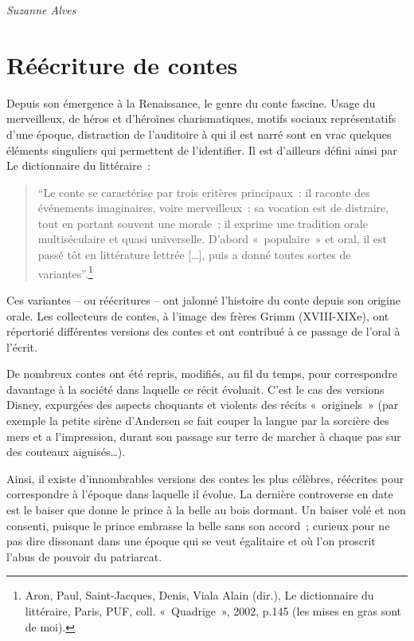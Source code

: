 \documentclass[
  10pt,
  french,
  a5paper,
  openany]{book}
\newenvironment{signature}{\begin{flushright}}{\end{flushright}}
\begin{document}
\begin{signature}
\emph{Suzanne Alves}

\end{signature}

\hypertarget{ruxe9uxe9criture-de-contes}{%
\chapter{Réécriture de contes}\label{ruxe9uxe9criture-de-contes}}

Depuis son émergence à la Renaissance, le genre du conte fascine. Usage du merveilleux, de héros et d'héroïnes charismatiques, motifs sociaux représentatifs d'une époque, distraction de l'auditoire à qui il est narré sont en vrac quelques éléments singuliers qui permettent de l'identifier. Il est d'ailleurs défini ainsi par Le dictionnaire du littéraire~:

\begin{quote}
``Le conte se caractérise par trois critères principaux~: il raconte des événements imaginaires, voire merveilleux~; sa vocation est de distraire, tout en portant souvent une morale~; il exprime une tradition orale multiséculaire et quasi universelle. D'abord «~populaire~» et oral, il est passé tôt en littérature lettrée {[}\ldots{]}, puis a donné toutes sortes de variantes''.\footnote{Aron, Paul, Saint-Jacques, Denis, Viala Alain (dir.), Le dictionnaire du littéraire, Paris, PUF, coll. «~Quadrige~», 2002, p.145 (les mises en gras sont de moi).}
\end{quote}

Ces variantes -- ou réécritures -- ont jalonné l'histoire du conte depuis son origine orale. Les collecteurs de contes, à l'image des frères Grimm (XVIII-XIXe), ont répertorié différentes versions des contes et ont contribué à ce passage de l'oral à l'écrit.

De nombreux contes ont été repris, modifiés, au fil du temps, pour correspondre davantage à la société dans laquelle ce récit évoluait. C'est le cas des versions Disney, expurgées des aspects choquants et violents des récits «~originels~» (par exemple la petite sirène d'Andersen se fait couper la langue par la sorcière des mers et a l'impression, durant son passage sur terre de marcher à chaque pas sur des couteaux aiguisés\ldots).

Ainsi, il existe d'innombrables versions des contes les plus célèbres, réécrites pour correspondre à l'époque dans laquelle il évolue. La dernière controverse en date est le baiser que donne le prince à la belle au bois dormant. Un baiser volé et non consenti, puisque le prince embrasse la belle sans son accord~; curieux pour ne pas dire dissonant dans une époque qui se veut égalitaire et où l'on proscrit l'abus de pouvoir du patriarcat.
\end{document}
